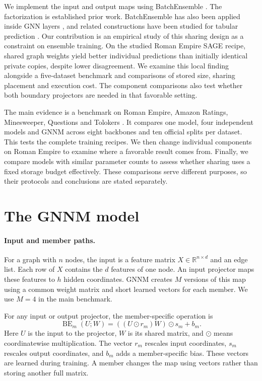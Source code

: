 \documentclass{article}
\begin{document}
We implement the input and output maps using BatchEnsemble \citep{wen2020batchensemble}. The factorization is established prior work. BatchEnsemble has also been applied inside GNN layers \citep{kim2023efficient}, and related constructions have been studied for tabular prediction \citep{gorishniy2025tabm}. Our contribution is an empirical study of this sharing design as a constraint on ensemble training. On the studied Roman Empire SAGE recipe, shared graph weights yield better individual predictions than initially identical private copies, despite lower disagreement. We examine this local finding alongside a five-dataset benchmark and comparisons of stored size, sharing placement and execution cost. The component comparisons also test whether both boundary projectors are needed in that favorable setting.

The main evidence is a benchmark on Roman Empire, Amazon Ratings, Minesweeper, Questions and Tolokers \citep{platonov2023critical}. It compares one model, four independent models and GNNM across eight backbones and ten official splits per dataset. This tests the complete training recipes. We then change individual components on Roman Empire to examine where a favorable result comes from. Finally, we compare models with similar parameter counts to assess whether sharing uses a fixed storage budget effectively. These comparisons serve different purposes, so their protocols and conclusions are stated separately.

\section{The GNNM model}\label{sec:method}
\paragraph{Input and member paths.}
For a graph with $n$ nodes, the input is a feature matrix $X\in\mathbb{R}^{n\times d}$ and an edge list. Each row of $X$ contains the $d$ features of one node. An input projector maps these features to $h$ hidden coordinates. GNNM creates $M$ versions of this map using a common weight matrix and short learned vectors for each member. We use $M=4$ in the main benchmark.

For any input or output projector, the member-specific operation is
\begin{equation}\label{eq:be}
\operatorname{BE}_m(U;W)=((U\odot r_m)W)\odot s_m+b_m.
\end{equation}
Here $U$ is the input to the projector, $W$ is its shared matrix, and $\odot$ means coordinatewise multiplication. The vector $r_m$ rescales input coordinates, $s_m$ rescales output coordinates, and $b_m$ adds a member-specific bias. These vectors are learned during training. A member changes the map using vectors rather than storing another full matrix.
\end{document}
